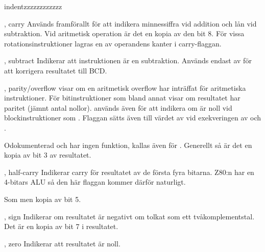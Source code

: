 \documentclass[main.tex]{subfiles}
\begin{document}
\begin{labeling}{indentzzzzzzzzzzzz}
    \item[\mono{C}, carry]
        Används framförallt för att indikera minnessiffra vid addition och lån
        vid subtraktion. Vid aritmetisk operation är det en kopia av den bit 8.
        För vissa rotationsinstruktioner lagras en av operandens kanter i
        carry-flaggan.
    \item[\mono{N}, subtract]
        Indikerar att instruktionen är en subtraktion. Används endast av
         för att korrigera resultatet till BCD.
    \item[\mono{P}, parity/overflow]
         visar om en aritmetisk overflow har inträffat för aritmetiska
        instruktioner. För bitinstruktioner som bland annat  visar
         om resultatet har paritet (jämnt antal nollor). 
        används även för att indikera om  är noll vid
        blockinstruktioner som . Flaggan sätts även till värdet av
         vid exekveringen av  och .
    \item[\mono{X}]
        Odokumenterad och har ingen funktion, kallas även för .
        Generellt så är det en kopia av bit 3 av resultatet.
    \item[\mono{H}, half-carry]
        Indikerar carry för resultatet av de första fyra bitarna. Z80:n har en
        4-bitars ALU så den här flaggan kommer därför naturligt.
    \item[\mono{Y}]
        Som  men kopia av bit 5.
    \item[\mono{S}, sign]
        Indikerar om resultatet är negativt om tolkat som ett
        tvåkomplementstal. Det är en kopia av bit 7 i resultatet.
    \item[\mono{Z}, zero]
        Indikerar att resultatet är noll.
\end{labeling}
\end{document}
